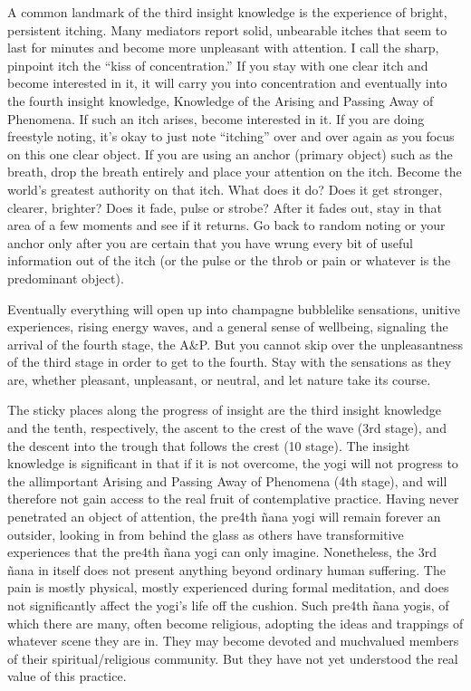 \documentclass[a5paper,10pt,english]{book}
\begin{document}
\sphinxAtStartPar
A common landmark of the third insight knowledge is the experience of
bright, persistent itching. Many mediators report solid, unbearable
itches that seem to last for minutes and become more unpleasant with
attention. I call the sharp, pinpoint itch the “kiss of concentration.”
If you stay with one clear itch and become interested in it, it will
carry you into concentration and eventually into the fourth insight
knowledge, Knowledge of the Arising and Passing Away of Phenomena. If
such an itch arises, become interested in it. If you are doing freestyle
noting, it’s okay to just note “itching” over and over again as you
focus on this one clear object. If you are using an anchor (primary
object) such as the breath, drop the breath entirely and place your
attention on the itch. Become the world’s greatest authority on that
itch. What does it do? Does it get stronger, clearer, brighter? Does it
fade, pulse or strobe? After it fades out, stay in that area of a few
moments and see if it returns. Go back to random noting or your anchor
only after you are certain that you have wrung every bit of useful
information out of the itch (or the pulse or the throb or pain or
whatever is the predominant object).

\sphinxAtStartPar
Eventually everything will open up into champagne bubble\sphinxhyphen{}like
sensations, unitive experiences, rising energy waves, and a general
sense of well\sphinxhyphen{}being, signaling the arrival of the fourth stage, the A\&P.
But you cannot skip over the unpleasantness of the third stage in order
to get to the fourth. Stay with the sensations as they are, whether
pleasant, unpleasant, or neutral, and let nature take its course.

\sphinxAtStartPar
The sticky places along the progress of insight are the third insight
knowledge and the tenth, respectively, the ascent to the crest of the
wave (3rd stage), and the descent into the trough that follows the crest
(10 stage). The insight knowledge is significant in that if it is not
overcome, the yogi will not progress to the all\sphinxhyphen{}important Arising and
Passing Away of Phenomena (4th stage), and will therefore not gain
access to the real fruit of contemplative practice. Having never
penetrated an object of attention, the pre\sphinxhyphen{}4th ñana yogi will remain
forever an outsider, looking in from behind the glass as others have
transformitive experiences that the pre\sphinxhyphen{}4th ñana yogi can only imagine.
Nonetheless, the 3rd ñana in itself does not present anything beyond
ordinary human suffering. The pain is mostly physical, mostly
experienced during formal meditation, and does not significantly affect
the yogi’s life off the cushion. Such pre\sphinxhyphen{}4th ñana yogis, of which there
are many, often become religious, adopting the ideas and trappings of
whatever scene they are in. They may become devoted and much\sphinxhyphen{}valued
members of their spiritual/religious community. But they have not yet
understood the real value of this practice.
\end{document}
